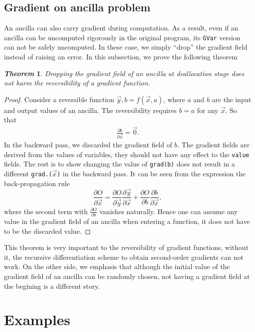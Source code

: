 \documentclass[aps,twocolumn,longbibliography,english,superscriptaddress]{revtex4-1}
\newcommand{\<}{\langle}
\renewcommand{\>}{\rangle}
\newcommand{\vx}{{\vec x}}
\newcommand{\vy}{{\vec y}}
\newtheorem{theorem}{\textit{Theorem}}
\theoremstyle{definition}\newtheorem{definition}{\textit{Definition}}
\begin{document}
\subsection{Gradient on ancilla problem}
An ancilla can also carry gradient during computation. As a result, even if an ancilla can be uncomputed rigorously in the original program, its \texttt{GVar} version can not be safely uncomputed.
In these case, we simply ``drop'' the gradient field instead of raising an error. In this subsection, we prove the following theorem
\begin{theorem}
    Dropping the gradient field of an ancilla at deallocation stage does not harm the reversibility of a gradient function.
\end{theorem}
\begin{proof}
Consider a reversible function $\vy, b = f(\vx, a)$, where $a$ and $b$ are the input and output values of an ancilla. The reversibility requires $b=a$ for any $\vx$. So that
\begin{align}
    \frac{\partial b}{\partial \vx} = \vec 0.
\end{align}
In the backward pass, we discarded the gradient field of $b$.
The gradient fields are derived from the values of variables, they should not have any effect to the \texttt{value} fields.
The rest is to show changing the value of \texttt{grad(b)} does not result in a different \texttt{grad.($\vx$)} in the backward pass. It can be seen from the expression the back-propagation rule 
\begin{equation}
    \frac{\partial O}{\partial \vx} = \frac{\partial O}{\partial \vy}\frac{\partial \vy}{\partial \vx} + \frac{\partial O}{\partial b}\frac{\partial b}{\partial \vx},
\end{equation}
where the second term with $\frac{\partial O}{\partial{b}}$ vanishes naturally. Hence one can assume any value in the gradient field of an ancilla when entering a function, it does not have to be the discarded value.
\end{proof}
This theorem is very important to the reversibility of gradient functions, without it, the recursive differentiation scheme to obtain second-order gradients can not work.
On the other side, we emphasis that although the initial value of the gradient field of an ancilla can be randomly chosen, not having a gradient field at the begining is a different story.

\section{Examples}\label{sec:example}
\end{document}
